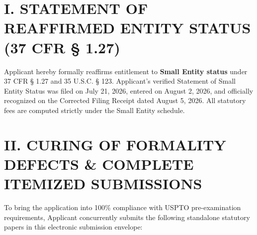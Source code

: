 \documentclass[11pt,letterpaper]{article}
\begin{document}
\section*{I. STATEMENT OF REAFFIRMED ENTITY STATUS (37 CFR \S{} 1.27)}

Applicant hereby formally reaffirms entitlement to \textbf{Small Entity status} under 37 CFR \S{} 1.27 and 35 U.S.C. \S{} 123. Applicant's verified Statement of Small Entity Status was filed on July 21, 2026, entered on August 2, 2026, and officially recognized on the Corrected Filing Receipt dated August 5, 2026. All statutory fees are computed strictly under the Small Entity schedule.

\section*{II. CURING OF FORMALITY DEFECTS \& COMPLETE ITEMIZED SUBMISSIONS}

To bring the application into 100\% compliance with USPTO pre-examination requirements, Applicant concurrently submits the following standalone statutory papers in this electronic submission envelope:
\end{document}
